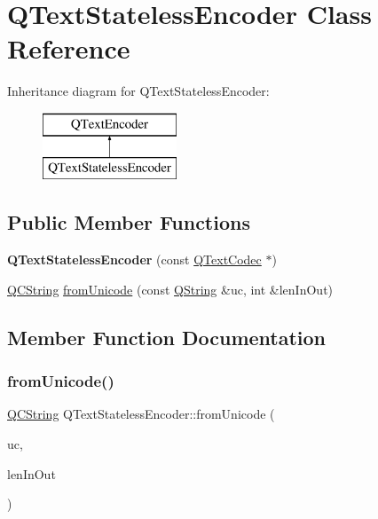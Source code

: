 \hypertarget{class_q_text_stateless_encoder}{}\section{Q\+Text\+Stateless\+Encoder Class Reference}
\label{class_q_text_stateless_encoder}
Inheritance diagram for Q\+Text\+Stateless\+Encoder\+:\begin{figure}[H]
\begin{center}
\leavevmode
\includegraphics[height=2.000000cm]{class_q_text_stateless_encoder}
\end{center}
\end{figure}
\subsection*{Public Member Functions}
\begin{DoxyCompactItemize}
\item 
\mbox{\label{class_q_text_stateless_encoder_af214e4fae6622da28c20d516acf8ed82}} 
{\bfseries Q\+Text\+Stateless\+Encoder} (const \mbox{\hyperlink{class_q_text_codec}{Q\+Text\+Codec}} $\ast$)
\item 
\mbox{\hyperlink{class_q_c_string}{Q\+C\+String}} \mbox{\hyperlink{class_q_text_stateless_encoder_a8466950847e702e588d182a582ba660f}{from\+Unicode}} (const \mbox{\hyperlink{class_q_string}{Q\+String}} \&uc, int \&len\+In\+Out)
\end{DoxyCompactItemize}


\subsection{Member Function Documentation}
\mbox{\label{class_q_text_stateless_encoder_a8466950847e702e588d182a582ba660f}} 
\subsubsection{\texorpdfstring{fromUnicode()}{fromUnicode()}}
{\footnotesize\ttfamily \mbox{\hyperlink{class_q_c_string}{Q\+C\+String}} Q\+Text\+Stateless\+Encoder\+::from\+Unicode (\begin{DoxyParamCaption}\item[{const \mbox{\hyperlink{class_q_string}{Q\+String}} \&}]{uc,  }\item[{int \&}]{len\+In\+Out }\end{DoxyParamCaption})\hspace{0.3cm}{\ttfamily [virtual]}}

